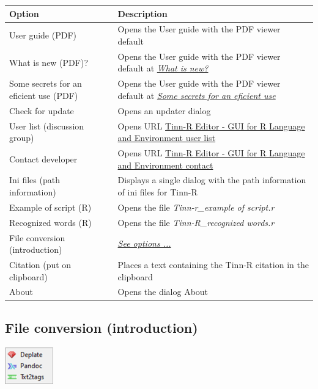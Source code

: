 \begin{scriptsize}
  \begin{tabularx}{\textwidth}{>{\hsize=0.3\hsize}X>{\hsize=0.7\hsize}X}\\
    \hline
    \textbf{Option} & \textbf{Description} \\
    \hline
    User guide (PDF) & Opens the User guide with the PDF viewer default \\
    What is new (PDF)? & Opens the User guide with the PDF viewer default at \textit{\href{\#whatisnew}{What is new?}} \\
    Some secrets for an eficient use (PDF) & Opens the User guide with the PDF viewer default at \textit{\href{\#secrets}{Some secrets for an eficient use}} \\
    Check for update & Opens an updater dialog \\
    User list (discussion group) & Opens URL \href{http://groups.google.com/forum/?fromgroups\#!forum/tinn-r}{Tinn-R Editor - GUI for R Language and Environment user list} \\
    Contact developer & Opens URL \href{https://tinn-r.org/en/contact}{Tinn-R Editor - GUI for R Language and Environment contact} \\
    Ini files (path information) & Displays a single dialog with the path information of ini files for Tinn-R \\
    Example of script (R) & Opens the file \textit{Tinn-r\_example of script.r} \\
    Recognized words (R) & Opens the file \textit{Tinn-R\_recognized words.r} \\
    File conversion (introduction) & \textit{\href{\#menu\_help\_main\_fileconversion}{See options ...}} \\
    Citation (put on clipboard) & Places a text containing the Tinn-R citation in the clipboard \\
    About & Opens the dialog About \\
    \hline
  \end{tabularx}
\end{scriptsize}


\hypertarget{menu_help_main_fileconversion}{}
\subsection{File conversion (introduction)}

\includegraphics[scale=0.50]{./res/menu_help_conversion.png}\\

